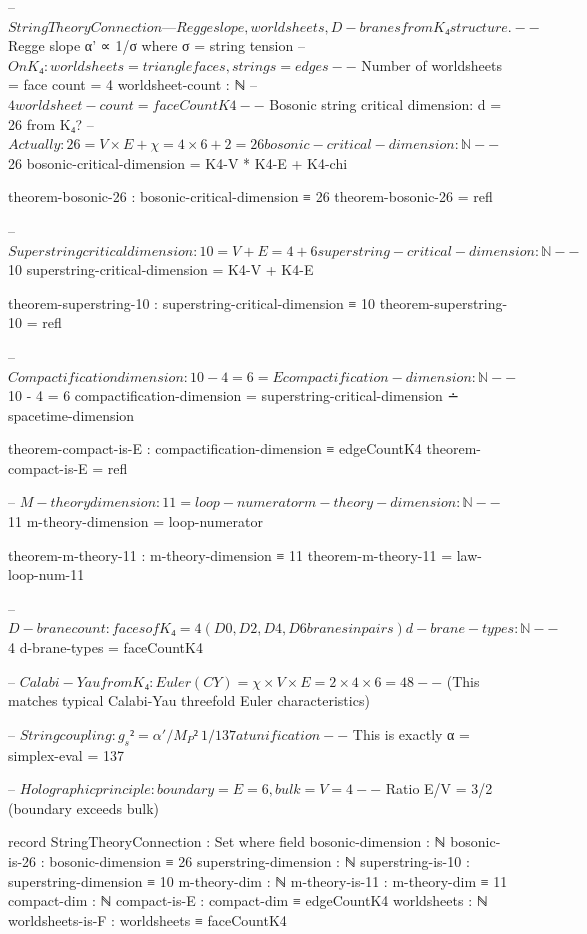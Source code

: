 \documentclass[11pt,a4paper]{book}
\begin{document}
\begin{code}
-- $ String Theory Connection — Regge slope, worldsheets, D-branes from K₄ structure.

-- $ Regge slope α' ∝ 1/σ where σ = string tension
-- $ On K₄: world sheets = triangle faces, strings = edges

-- $ Number of worldsheets = face count = 4
worldsheet-count : ℕ
-- $ 4
worldsheet-count = faceCountK4

-- $ Bosonic string critical dimension: d = 26 from K₄?
-- $ Actually: 26 = V × E + χ = 4 × 6 + 2 = 26
bosonic-critical-dimension : ℕ
-- $ 26
bosonic-critical-dimension = K4-V * K4-E + K4-chi

theorem-bosonic-26 : bosonic-critical-dimension ≡ 26
theorem-bosonic-26 = refl

-- $ Superstring critical dimension: 10 = V + E = 4 + 6
superstring-critical-dimension : ℕ
-- $ 10
superstring-critical-dimension = K4-V + K4-E

theorem-superstring-10 : superstring-critical-dimension ≡ 10
theorem-superstring-10 = refl

-- $ Compactification dimension: 10 - 4 = 6 = E
compactification-dimension : ℕ
-- $ 10 - 4 = 6
compactification-dimension = superstring-critical-dimension ∸ spacetime-dimension

theorem-compact-is-E : compactification-dimension ≡ edgeCountK4
theorem-compact-is-E = refl

-- $ M-theory dimension: 11 = loop-numerator
m-theory-dimension : ℕ
-- $ 11
m-theory-dimension = loop-numerator

theorem-m-theory-11 : m-theory-dimension ≡ 11
theorem-m-theory-11 = law-loop-num-11

-- $ D-brane count: faces of K₄ = 4 (D0, D2, D4, D6 branes in pairs)
d-brane-types : ℕ
-- $ 4
d-brane-types = faceCountK4

-- $ Calabi-Yau from K₄: Euler(CY) = χ × V × E = 2 × 4 × 6 = 48
-- $ (This matches typical Calabi-Yau threefold Euler characteristics)

-- $ String coupling: g_s² = α'/M_P² ~ 1/137 at unification
-- $ This is exactly α = simplex-eval = 137

-- $ Holographic principle: boundary = E = 6, bulk = V = 4
-- $ Ratio E/V = 3/2 (boundary exceeds bulk)

record StringTheoryConnection : Set where
  field
    bosonic-dimension      : ℕ
    bosonic-is-26         : bosonic-dimension ≡ 26
    superstring-dimension  : ℕ
    superstring-is-10     : superstring-dimension ≡ 10
    m-theory-dim          : ℕ
    m-theory-is-11        : m-theory-dim ≡ 11
    compact-dim           : ℕ
    compact-is-E          : compact-dim ≡ edgeCountK4
    worldsheets           : ℕ
    worldsheets-is-F      : worldsheets ≡ faceCountK4


\end{code}
\end{document}
